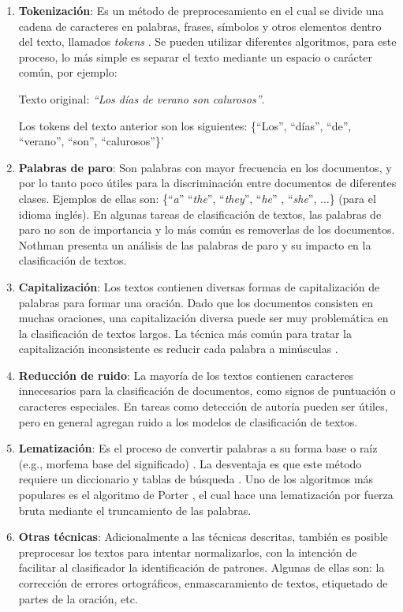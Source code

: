 \begin{enumerate}
\item \textbf{Tokenización}: Es un método de preprocesamiento en el cual se divide una cadena de caracteres en palabras, frases, símbolos y otros elementos dentro del texto, llamados \textit{tokens} \citep{kowsari2019text}. Se pueden utilizar diferentes algoritmos, para este proceso, lo más simple es separar el texto mediante un espacio o carácter común, por ejemplo:

Texto original: \textit{``Los días de verano son calurosos''}.

Los tokens del texto anterior son los siguientes: \{``Los'',  ``días'', ``de'', ``verano'', ``son'', ``calurosos''\}'

\item \textbf{Palabras de paro}: Son palabras con mayor frecuencia en los documentos, y por lo tanto poco útiles para la discriminación entre documentos de diferentes clases. Ejemplos de ellas son: \{``\textit{a}'' ``\textit{the}'', ``\textit{they}'', ``\textit{he}'' , ``\textit{she}'', ...\} (para el idioma inglés). En algunas tareas de clasificación de textos, las palabras de paro no son de importancia y lo más común es removerlas de los documentos. Nothman \citep{nothman2018stop} presenta un análisis de las palabras de paro y su impacto en la clasificación de textos.

\item \textbf{Capitalización}: Los textos contienen diversas formas de capitalización de palabras para formar una oración. Dado que los documentos consisten en muchas oraciones, una capitalización diversa puede ser muy problemática en la clasificación de textos largos. La técnica más común para tratar la capitalización inconsistente es reducir cada palabra a minúsculas \citep{kowsari2019text}.

\item \textbf{Reducción de ruido}: La mayoría de los textos contienen caracteres innecesarios para la clasificación de documentos, como signos de puntuación o caracteres especiales. En tareas como detección de autoría pueden ser útiles, pero en general agregan ruido a los modelos de clasificación de textos.

\item \textbf{Lematización}:  Es el proceso de convertir palabras a su forma base o raíz (e.g., morfema base del significado) \citep{kamath2019deep}. La desventaja es que este método requiere un diccionario y tablas de búsqueda \citep{kamath2019deep}. Uno de los algoritmos más populares es el algoritmo de Porter \citep{porter2001snowball}, el cual hace una lematización por fuerza bruta mediante el truncamiento de las palabras.

\item  \textbf{Otras técnicas}: Adicionalmente a las técnicas descritas, también es posible preprocesar los textos para intentar normalizarlos, con la intención de facilitar al clasificador la identificación de patrones. Algunas de ellas son: la corrección de errores ortográficos, enmascaramiento de textos, etiquetado de partes de la oración, etc.

\end{enumerate}


